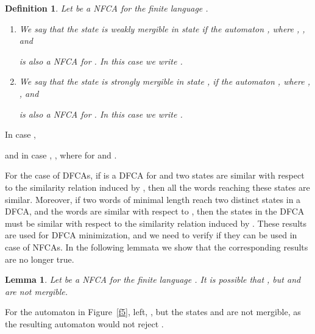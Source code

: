 \documentclass[submission,copyright,creativecommons]{eptcs}
\newtheorem{definition}{Definition}
\newtheorem{lemma}{Lemma}
\newenvironment{proof}[1][Proof]{\begin{trivlist}
\item[\hskip \labelsep {\bfseries #1}]}{\end{trivlist}}
\begin{document}
\begin{definition}
 Let  be a NFCA for the finite language . 
\begin{enumerate}
 \item We say that the state  is {\em weakly mergible} in state 
if the automaton
, where
, , and 

 is also a NFCA for .
In this case we write .
\item We say that the state  is {\em strongly mergible} in state , 
if the automaton
, where
, , and 

 is also a NFCA for .
In this case we write .
\end{enumerate}
\end{definition}
In case , 

and in case , 
, where for 
 and
.


For the case of DFCAs, if  is a DFCA for  and two states are similar with respect
 to the similarity relation induced by , then all the words reaching these states are similar.
Moreover, if two words of minimal length reach two distinct states in a DFCA, and the words are similar
with respect to , then the states in the DFCA must be similar with respect to the similarity 
relation induced by . These results are used  for DFCA minimization, and we need to verify 
if they can be used in case of NFCAs. In the following lemmata we show that  
 the corresponding results are no longer true.

\begin{lemma}
 Let  be a NFCA for the finite language .
It is possible that , but  and  are not mergible.
\end{lemma}
\begin{proof}
 For the automaton in Figure~\ref{f5}, left, , but the states  and  are not mergible,
as the resulting automaton would not reject .
\end{proof}
\end{document}
